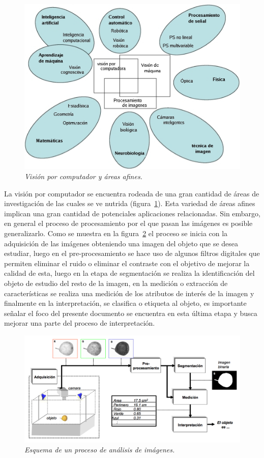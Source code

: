 \begin{figure}[tp]
  \centering
  \includegraphics[scale=.3]{images/cv-context}
  \caption{\em Visión por computador y áreas afines.}  
  \label{fig:cvcontext}
\end{figure}

La visión por computador se encuentra rodeada de una gran cantidad de áreas de investigación de las cuales se ve nutrida (figura~\ref{fig:cvcontext}). Esta variedad de áreas afines implican una gran cantidad de potenciales aplicaciones relacionadas. Sin embargo, en general el proceso de procesamiento por el que pasan las imágenes es posible generalizarlo. Como se muestra en la figura~\ref{fig:cvprocess} el proceso se inicia con la adquisición de las imágenes obteniendo una imagen del objeto que se desea estudiar, luego en el pre-procesamiento se hace uso de algunos filtros digitales que permiten eliminar el ruido o eliminar el contraste con el objetivo de mejorar la calidad de esta, luego en la etapa de segmentación se realiza la identificación del objeto de estudio del resto de la imagen, en la medición o extracción de características se realiza una medición de los atributos de interés de la imagen y finalmente en la interpretación, se clasifica o etiqueta al objeto, es importante señalar el foco del presente documento se encuentra en esta última etapa y busca mejorar una parte del proceso de interpretación.

\begin{figure}[tp]
  \centering
  \includegraphics[scale=.3]{images/cv-system}
  \caption{\em Esquema de un proceso de análisis de imágenes.} 
  \label{fig:cvprocess}
\end{figure}


